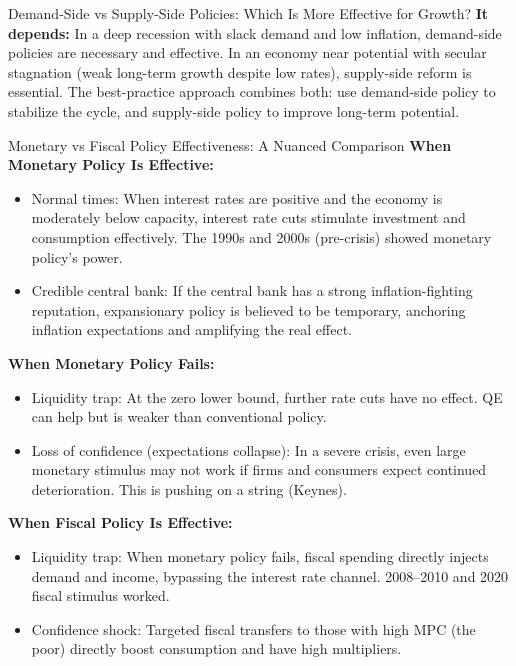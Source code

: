 \documentclass[11pt, a4paper, twoside]{book}
\begin{document}
\begin{evaluation}{Demand-Side vs Supply-Side Policies: Which Is More Effective for Growth?}
\textbf{It depends:}
In a deep recession with slack demand and low inflation, demand-side policies are necessary and effective. In an economy near potential with secular stagnation (weak long-term growth despite low rates), supply-side reform is essential. The best-practice approach combines both: use demand-side policy to stabilize the cycle, and supply-side policy to improve long-term potential.
\end{evaluation}

\begin{evaluation}{Monetary vs Fiscal Policy Effectiveness: A Nuanced Comparison}
\textbf{When Monetary Policy Is Effective:}
\begin{itemize}
  \item Normal times: When interest rates are positive and the economy is moderately below capacity, interest rate cuts stimulate investment and consumption effectively. The 1990s and 2000s (pre-crisis) showed monetary policy's power.
  \item Credible central bank: If the central bank has a strong inflation-fighting reputation, expansionary policy is believed to be temporary, anchoring inflation expectations and amplifying the real effect.
\end{itemize}

\textbf{When Monetary Policy Fails:}
\begin{itemize}
  \item Liquidity trap: At the zero lower bound, further rate cuts have no effect. QE can help but is weaker than conventional policy.
  \item Loss of confidence (expectations collapse): In a severe crisis, even large monetary stimulus may not work if firms and consumers expect continued deterioration. This is pushing on a string (Keynes).
\end{itemize}

\textbf{When Fiscal Policy Is Effective:}
\begin{itemize}
  \item Liquidity trap: When monetary policy fails, fiscal spending directly injects demand and income, bypassing the interest rate channel. 2008--2010 and 2020 fiscal stimulus worked.
  \item Confidence shock: Targeted fiscal transfers to those with high MPC (the poor) directly boost consumption and have high multipliers.
\end{itemize}


\end{evaluation}
\end{document}
